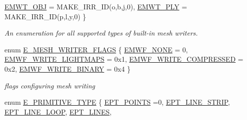 \begin{DoxyCompactItemize}
\hyperlink{namespaceirr_1_1scene_a431fa15741518ba15f6d5f2608b6cb4eae22b9ef8ea7befd1368d7b90bbe12992}{E\+M\+W\+T\+\_\+\+O\+BJ} = M\+A\+K\+E\+\_\+\+I\+R\+R\+\_\+\+ID(\textquotesingle{}o\textquotesingle{},\textquotesingle{}b\textquotesingle{},\textquotesingle{}j\textquotesingle{},0), 
\newline
\hyperlink{namespaceirr_1_1scene_a431fa15741518ba15f6d5f2608b6cb4ead00c87763ef520a5115e9920968c0108}{E\+M\+W\+T\+\_\+\+P\+LY} = M\+A\+K\+E\+\_\+\+I\+R\+R\+\_\+\+ID(\textquotesingle{}p\textquotesingle{},\textquotesingle{}l\textquotesingle{},\textquotesingle{}y\textquotesingle{},0)
 \}\begin{DoxyCompactList}\small\item\em An enumeration for all supported types of built-\/in mesh writers. \end{DoxyCompactList}
\item 
enum \hyperlink{namespaceirr_1_1scene_a9faae6cd9e415a0553cb4cdc190bbc1d}{E\+\_\+\+M\+E\+S\+H\+\_\+\+W\+R\+I\+T\+E\+R\+\_\+\+F\+L\+A\+GS} \{ \hyperlink{namespaceirr_1_1scene_a9faae6cd9e415a0553cb4cdc190bbc1daf2dfebddfd0a2cd2b558e23cb6a87464}{E\+M\+W\+F\+\_\+\+N\+O\+NE} = 0, 
\hyperlink{namespaceirr_1_1scene_a9faae6cd9e415a0553cb4cdc190bbc1daee23ec8ad339e67c03c424d5adb94a66}{E\+M\+W\+F\+\_\+\+W\+R\+I\+T\+E\+\_\+\+L\+I\+G\+H\+T\+M\+A\+PS} = 0x1, 
\hyperlink{namespaceirr_1_1scene_a9faae6cd9e415a0553cb4cdc190bbc1dac7c70ee80dc1a33aac68d317cb9c2cb7}{E\+M\+W\+F\+\_\+\+W\+R\+I\+T\+E\+\_\+\+C\+O\+M\+P\+R\+E\+S\+S\+ED} = 0x2, 
\hyperlink{namespaceirr_1_1scene_a9faae6cd9e415a0553cb4cdc190bbc1da06511a5df874b2b69a146e0bbcb70309}{E\+M\+W\+F\+\_\+\+W\+R\+I\+T\+E\+\_\+\+B\+I\+N\+A\+RY} = 0x4
 \}\begin{DoxyCompactList}\small\item\em flags configuring mesh writing \end{DoxyCompactList}
\item 
enum \hyperlink{namespaceirr_1_1scene_a5d7de82f2169761194b2f44d95cdc1dc}{E\+\_\+\+P\+R\+I\+M\+I\+T\+I\+V\+E\+\_\+\+T\+Y\+PE} \{ \newline
\hyperlink{namespaceirr_1_1scene_a5d7de82f2169761194b2f44d95cdc1dca180689eadf794441c2c2dcd87462e203}{E\+P\+T\+\_\+\+P\+O\+I\+N\+TS} =0, 
\hyperlink{namespaceirr_1_1scene_a5d7de82f2169761194b2f44d95cdc1dca5e391340a0edd5f94b7e2a977637215c}{E\+P\+T\+\_\+\+L\+I\+N\+E\+\_\+\+S\+T\+R\+IP}, 
\hyperlink{namespaceirr_1_1scene_a5d7de82f2169761194b2f44d95cdc1dcaf54da57a43051cfc6e95185b38e86625}{E\+P\+T\+\_\+\+L\+I\+N\+E\+\_\+\+L\+O\+OP}, 
\hyperlink{namespaceirr_1_1scene_a5d7de82f2169761194b2f44d95cdc1dca1227c9648d4d9d7449ca1f959740b92b}{E\+P\+T\+\_\+\+L\+I\+N\+ES}, 

\end{DoxyCompactItemize}
